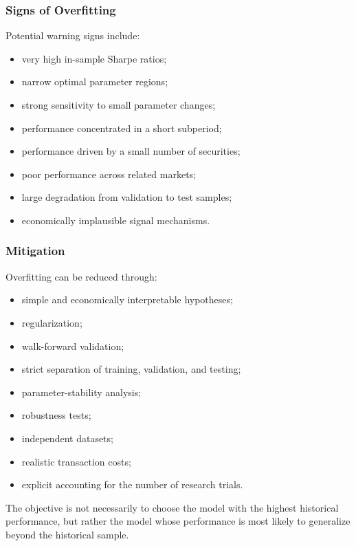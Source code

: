 \documentclass[11pt,a4paper]{article}
\begin{document}
\subsubsection{Signs of Overfitting}

Potential warning signs include:

\begin{itemize}
    \item very high in-sample Sharpe ratios;
    \item narrow optimal parameter regions;
    \item strong sensitivity to small parameter changes;
    \item performance concentrated in a short subperiod;
    \item performance driven by a small number of securities;
    \item poor performance across related markets;
    \item large degradation from validation to test samples;
    \item economically implausible signal mechanisms.
\end{itemize}


\subsubsection{Mitigation}

Overfitting can be reduced through:

\begin{itemize}
    \item simple and economically interpretable hypotheses;
    \item regularization;
    \item walk-forward validation;
    \item strict separation of training, validation, and testing;
    \item parameter-stability analysis;
    \item robustness tests;
    \item independent datasets;
    \item realistic transaction costs;
    \item explicit accounting for the number of research trials.
\end{itemize}

The objective is not necessarily to choose the model with the highest
historical performance, but rather the model whose performance is most likely
to generalize beyond the historical sample.
\end{document}
